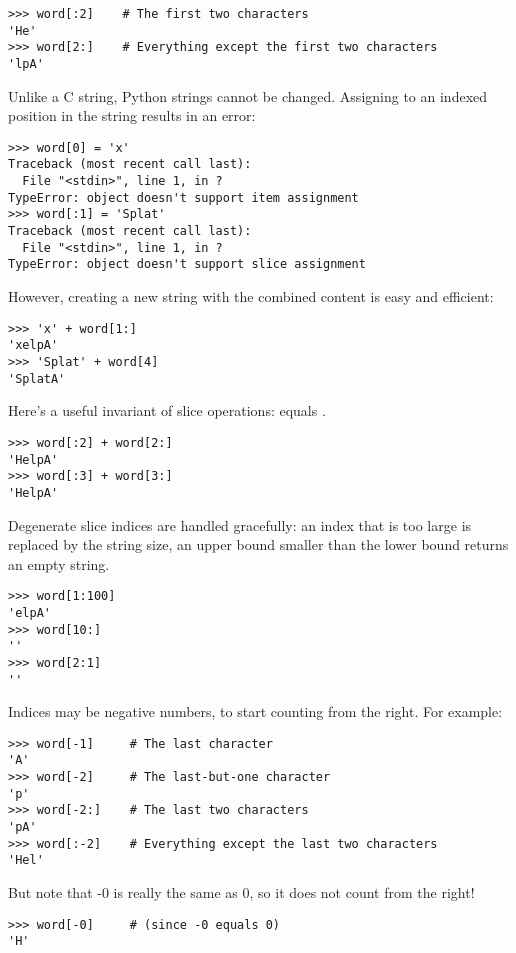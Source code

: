 \documentclass{manual}
\begin{document}
\begin{verbatim}
>>> word[:2]    # The first two characters
'He'
>>> word[2:]    # Everything except the first two characters
'lpA'
\end{verbatim}

Unlike a C string, Python strings cannot be changed.  Assigning to an 
indexed position in the string results in an error:

\begin{verbatim}
>>> word[0] = 'x'
Traceback (most recent call last):
  File "<stdin>", line 1, in ?
TypeError: object doesn't support item assignment
>>> word[:1] = 'Splat'
Traceback (most recent call last):
  File "<stdin>", line 1, in ?
TypeError: object doesn't support slice assignment
\end{verbatim}

However, creating a new string with the combined content is easy and
efficient:

\begin{verbatim}
>>> 'x' + word[1:]
'xelpA'
>>> 'Splat' + word[4]
'SplatA'
\end{verbatim}

Here's a useful invariant of slice operations:
 equals .

\begin{verbatim}
>>> word[:2] + word[2:]
'HelpA'
>>> word[:3] + word[3:]
'HelpA'
\end{verbatim}

Degenerate slice indices are handled gracefully: an index that is too
large is replaced by the string size, an upper bound smaller than the
lower bound returns an empty string.

\begin{verbatim}
>>> word[1:100]
'elpA'
>>> word[10:]
''
>>> word[2:1]
''
\end{verbatim}

Indices may be negative numbers, to start counting from the right.
For example:

\begin{verbatim}
>>> word[-1]     # The last character
'A'
>>> word[-2]     # The last-but-one character
'p'
>>> word[-2:]    # The last two characters
'pA'
>>> word[:-2]    # Everything except the last two characters
'Hel'
\end{verbatim}

But note that -0 is really the same as 0, so it does not count from
the right!

\begin{verbatim}
>>> word[-0]     # (since -0 equals 0)
'H'
\end{verbatim}
\end{document}
